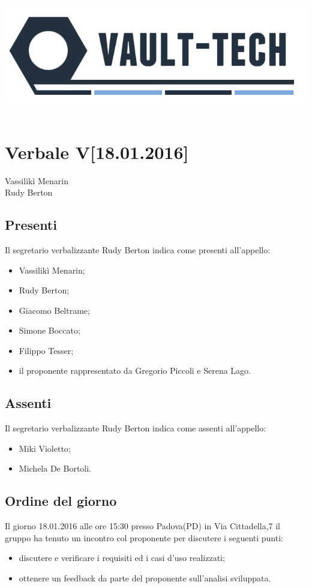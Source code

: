 \documentclass[a4paper]{article}
\def\DATA{18.01.2016}
\def\ORA{15:30}
\def\CITTA{Padova}
\def\PROVINCIA{PD}
\def\VIA{Via Cittadella,7}
\def\SEGRETARIO{Rudy Berton}
\def\RESPONSABILE{Vassilikì Menarin}
\begin{document}
\begin{center}
\includegraphics[scale=0.5]{Img/logo.png}\\
\vspace{1cm}
{\Huge \PROGETTO}\\
\vspace{1cm}
\section*{Verbale V[\DATA]}
\end{center}

%
%
 \RESPONSABILE
\\  \SEGRETARIO
\\
\subsection*{Presenti}
Il segretario verbalizzante \SEGRETARIO{} indica come presenti all'appello:
\begin{itemize}
\item Vassilikì Menarin;
\item Rudy Berton;
\item Giacomo Beltrame;
\item Simone Boccato;
\item Filippo Tesser;
\item il proponente rappresentato da Gregorio Piccoli e Serena Lago.
\end{itemize}

\subsection*{Assenti}
Il segretario verbalizzante \SEGRETARIO{} indica come assenti all'appello:
\begin{itemize}
\item Miki Violetto;
\item Michela De Bortoli.
\end{itemize}

\subsection*{Ordine del giorno}
Il giorno \DATA{} alle ore \ORA{} presso \CITTA (\PROVINCIA) in \VIA{} il gruppo \AUTORE{} ha tenuto un incontro col proponente per discutere i seguenti punti:
\begin{itemize}
\item discutere e verificare i requisiti ed i casi d'uso realizzati;
\item ottenere un feedback da parte del proponente sull'analisi sviluppata.
\end{itemize}
\end{document}
